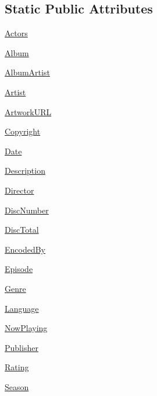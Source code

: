 \subsection*{Static Public Attributes}
\begin{DoxyCompactItemize}
\item 
\hyperlink{classvlc_1_1_meta_a736ce93fb9c362d4d5bdf6ab0a2e5b4a}{Actors}
\item 
\hyperlink{classvlc_1_1_meta_a270aeb5959ead37114825558974ced1a}{Album}
\item 
\hyperlink{classvlc_1_1_meta_afcc4e5298858a0830aff62c2fd434e15}{Album\+Artist}
\item 
\hyperlink{classvlc_1_1_meta_ad3a758a7e82f504a71f6f561e4beff3a}{Artist}
\item 
\hyperlink{classvlc_1_1_meta_a7e564007f23cc123a39a79fc1b064188}{Artwork\+U\+RL}
\item 
\hyperlink{classvlc_1_1_meta_a1157dc855abf896f2c07420b0a13e972}{Copyright}
\item 
\hyperlink{classvlc_1_1_meta_a5c20e50ee6f56cce1d09b501c7a6225e}{Date}
\item 
\hyperlink{classvlc_1_1_meta_a2c435266003465ca1092f76df0747cb1}{Description}
\item 
\hyperlink{classvlc_1_1_meta_a96e0e845c153610f2a2f0ad3238a2511}{Director}
\item 
\hyperlink{classvlc_1_1_meta_a419a21e6676dcf02b532fb113f5eb7ca}{Disc\+Number}
\item 
\hyperlink{classvlc_1_1_meta_aa8e550fa290ce9cf809cdea997367085}{Disc\+Total}
\item 
\hyperlink{classvlc_1_1_meta_a4ff1abe8910ee9bf0fbefb16d5390906}{Encoded\+By}
\item 
\hyperlink{classvlc_1_1_meta_aa9899b38fca58f2ac19613537a45ee0a}{Episode}
\item 
\hyperlink{classvlc_1_1_meta_a5cd9403a8971f75311aa139040d38bbd}{Genre}
\item 
\hyperlink{classvlc_1_1_meta_a315ca917ad583797f709ea477dd28705}{Language}
\item 
\hyperlink{classvlc_1_1_meta_aa1952c46589f857c0b2d5532180a5d30}{Now\+Playing}
\item 
\hyperlink{classvlc_1_1_meta_ae77fe6e4dbe11321074a3e38b4c05d88}{Publisher}
\item 
\hyperlink{classvlc_1_1_meta_a2a733f4621e083597f59d9c15f64df61}{Rating}
\item 
\hyperlink{classvlc_1_1_meta_ace3a72289effba7c41de4a566bd3c300}{Season}
\item 

\end{DoxyCompactItemize}
